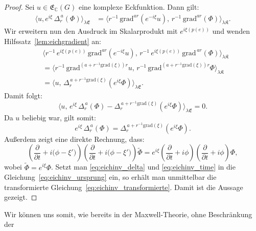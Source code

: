 \documentclass[11pt,a4paper,leqno]{report}
\numberwithin{equation}{chapter}
\begin{document}
\begin{proof}
	Sei \(u \in \mathfrak{E}_\mathbb{C}(G)\) eine komplexe Eckfunktion. Dann gilt:
	\begin{align*}
		\langle u, e^{i\xi}\, \Delta_r^{\,a}(\Phi) \rangle_{\lambda\mathfrak{E}}
		&= \langle r^{-1}\,\mathrm{grad}^{a r}(e^{-i\xi}u),\, 
		r^{-1}\,\mathrm{grad}^{a r}(\Phi) \rangle_{\lambda\mathfrak{K}}.
	\end{align*}
	Wir erweitern nun den Ausdruck im Skalarprodukt mit \(e^{i\xi(p(e))}\) und wenden 
	Hilfssatz~\ref{lem:eichgradient} an: 
	\begin{align*}
		&\langle r^{-1}\,e^{i\xi(p(e))}\,\mathrm{grad}^{a r}(e^{-i\xi}u),\, 
		r^{-1}\,e^{i\xi(p(e))}\,\mathrm{grad}^{\,a r}(\Phi) \rangle_{\lambda\mathfrak{K}}\\
		&= \langle r^{-1}\,\mathrm{grad}^{(a + r^{-1}\mathrm{grad}(\xi))r}u,\, 
		r^{-1}\,\mathrm{grad}^{(a + r^{-1}\mathrm{grad}(\xi))r}\Phi \rangle_{\lambda\mathfrak{K}} \\
		&= \langle u,\, \Delta_r^{\,a + r^{-1}\mathrm{grad}(\xi)}(e^{i\xi}\Phi) \rangle_{\lambda\mathfrak{E}}.
	\end{align*}
	Damit folgt:
	\begin{equation*}
		\langle u,\, e^{i\xi}\,\Delta_r^{\,a}(\Phi)
		- \Delta_r^{\,a + r^{-1}\mathrm{grad}(\xi)}(e^{i\xi}\Phi) \rangle_{\lambda\mathfrak{E}} = 0.
	\end{equation*}
	Da \(u\) beliebig war, gilt somit:
	\begin{equation}\label{eq:eichinv_delta}
		e^{i\xi}\,\Delta_r^{\,a}(\Phi)
		= \Delta_r^{\,a + r^{-1}\mathrm{grad}(\xi)}(e^{i\xi}\Phi).
	\end{equation}
	Außerdem zeigt eine direkte Rechnung, dass:
	\begin{equation}\label{eq:eichinv_time}
		\left(\frac{\partial}{\partial t}
		+ i\bigl(\phi - \xi'\bigr)\right)
		\left(\frac{\partial}{\partial t}
		+ i\bigl(\phi - \xi'\bigr)\right)\tilde{\Phi}
		= e^{i\xi}
		\left(\frac{\partial}{\partial t} + i\phi\right)
		\left(\frac{\partial}{\partial t} + i\phi\right)\Phi,
	\end{equation}
	wobei \(\tilde{\Phi} = e^{i\xi}\Phi\). Setzt man \eqref{eq:eichinv_delta} und 
	\eqref{eq:eichinv_time} in die Gleichung~\eqref{eq:eichinv_ursprung} ein, so erhält 
	man unmittelbar die transformierte Gleichung~\eqref{eq:eichinv_transformierte}. 
	Damit ist die Aussage gezeigt.\qedhere
\end{proof}
\noindent
Wir können uns somit, wie bereits in der Maxwell-Theorie, ohne Beschränkung der 
\end{document}
